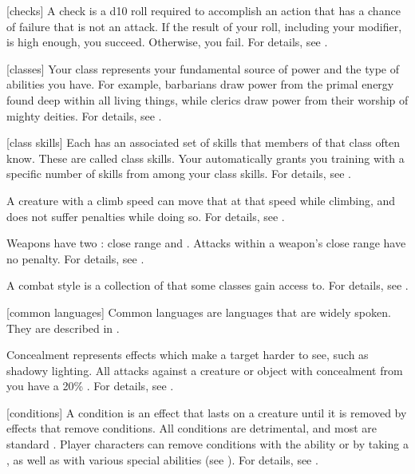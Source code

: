 [checks] A check is a d10 roll required to accomplish an action that has a chance of failure that is not an attack.
If the result of your roll, including your modifier, is high enough, you succeed.
Otherwise, you fail.
For details, see .

[classes] Your class represents your fundamental source of power and the type of abilities you have.
For example, barbarians draw power from the primal energy found deep within all living things, while clerics draw power from their worship of mighty deities.
For details, see .

[class skills] Each  has an associated set of skills that members of that class often know.
These are called class skills.
Your  automatically grants you training with a specific number of skills from among your class skills.
For details, see .

 A creature with a climb speed can move that at that speed while climbing, and does not suffer penalties while doing so.
For details, see .

 Weapons have two : close range and .
Attacks within a weapon's close range have no penalty.
For details, see .

 A combat style is a collection of  that some classes gain access to.
For details, see .

[common languages] Common languages are languages that are widely spoken.
They are described in .

 Concealment represents effects which make a target harder to see, such as shadowy lighting.
All  attacks against a creature or object with concealment from you have a 20\% .
For details, see .

[conditions] A condition is an effect that lasts on a creature until it is removed by effects that remove conditions.
All conditions are detrimental, and most are standard .
Player characters can remove conditions with the  ability or by taking a , as well as with various special abilities (see ).
For details, see .

